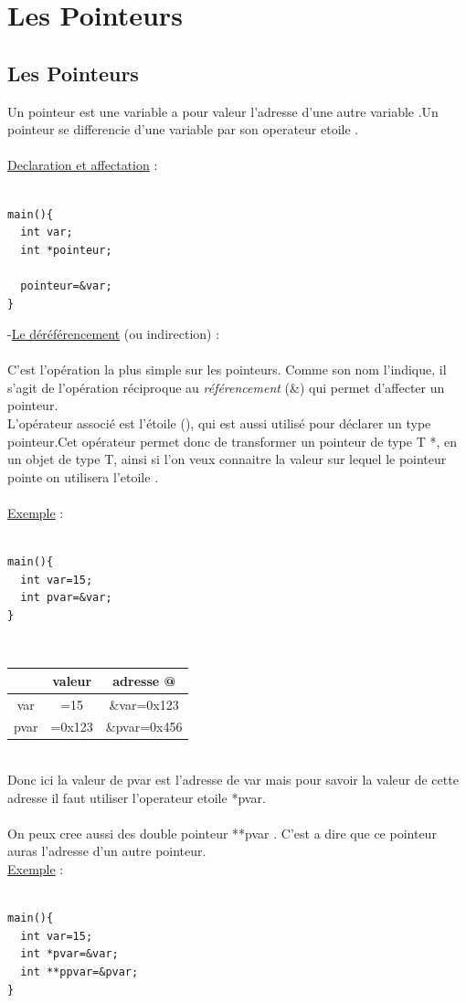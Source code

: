 \documentclass[a4paper,12pt,openany]{book}
\begin{document}
{\chapter{Les Pointeurs}

\section{Les Pointeurs}
Un pointeur est une variable a pour valeur  l'adresse d'une autre variable .Un pointeur se differencie d'une variable par son operateur etoile \* .\\
\\
\underline{Declaration et affectation} : \\
\\
\begin{verbatim}
main(){
  int var;
  int *pointeur;  

  pointeur=&var;
}
\end{verbatim}

-\underline{Le d\'er\'ef\'erencement} (ou indirection) :\\
\\
C'est l'op\'eration la plus simple sur les pointeurs. Comme son nom l'indique, il s'agit de l'opération réciproque au 
\emph{référencement} (\&) qui permet d'affecter un pointeur.\\ L'opérateur associé est l'étoile (\*), qui est aussi utilisé pour déclarer un type pointeur.Cet opérateur permet donc de transformer un pointeur de type T *, en un objet de type T, ainsi si l'on veux connaitre la valeur sur lequel le pointeur pointe on utilisera l'etoile .\\
\\
\underline{Exemple} :\\
\\
\begin{verbatim}
main(){
  int var=15;
  int pvar=&var;
}
\end{verbatim}
\\
\begin{tabular}{|c|c|c|}
\hline
 & valeur & adresse @ \\ \hline
var & =15 & \&var=0x123 \\ \hline
pvar & =0x123 & \&pvar=0x456 \\ \hline
\end{tabular}
\\
Donc ici la valeur de pvar est l'adresse de var mais pour savoir la valeur de cette adresse il faut utiliser l'operateur etoile *pvar.\\
\\
On peux cree aussi des double pointeur **pvar . C'est a dire que ce pointeur auras l'adresse d'un autre pointeur.\\
\underline{Exemple} :\\
\\
\begin{verbatim}
main(){
  int var=15;
  int *pvar=&var;
  int **ppvar=&pvar;
}
\end{verbatim}

}
\end{document}
